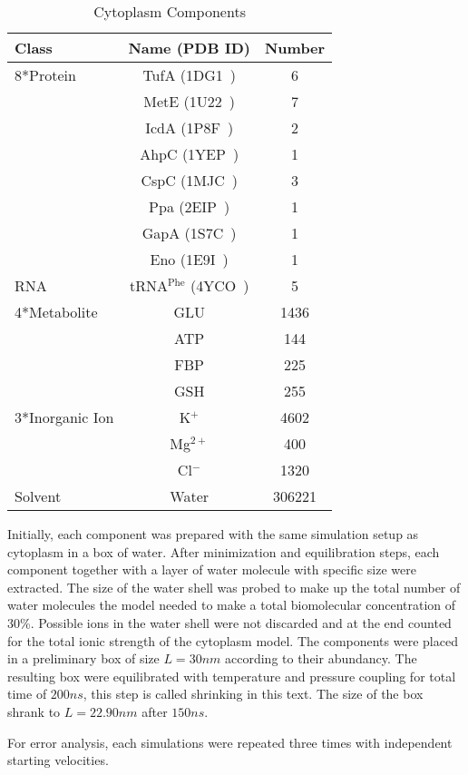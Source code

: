 \documentclass[journal=jacsat,manuscript=article]{achemso}
\begin{document}
\begin{table}[h!]
\label{tbl:component}
\centering
\begin{tabular}{lcc}
\hline
Class & Name (PDB ID) & Number\\
\hline
8*Protein & TufA (1DG1~\cite{Abel1996}) & 6\\
  & MetE (1U22~\cite{Ferrer2004}) & 7\\
  & IcdA (1P8F~\cite{Mesecar2000}) & 2\\
  & AhpC (1YEP~\cite{Parsonage2005}) & 1\\
  & CspC (1MJC~\cite{Schindelin1994}) & 3\\
  & Ppa (2EIP~\cite{Kankare1996}) & 1\\
  & GapA (1S7C~\cite{ShinXXX}) & 1\\
  & Eno (1E9I~\cite{Kuhnel2001}) & 1\\
\hline
RNA & tRNA$^{\text{Phe}}$ (4YCO~\cite{Byrne2015}) & 5\\
\hline
4*Metabolite & GLU & 1436\\
  & ATP & 144\\
  & FBP & 225\\
  & GSH & 255\\
\hline
3*Inorganic Ion & K$^{+}$ & 4602\\
  & Mg$^{2+}$ & 400\\
  & Cl$^{-}$ & 1320\\
\hline
Solvent & Water & 306221\\
\hline
\end{tabular}
\caption{Cytoplasm Components}
\end{table}

Initially, each component was prepared with the same simulation setup as cytoplasm in a box of water. After minimization and equilibration steps, each component together with a layer of water molecule with specific size were extracted. The size of the water shell was probed to make up the total number of water molecules the model needed to make a total biomolecular concentration of 30\%. Possible ions in the water shell were not discarded and at the end counted for the total ionic strength of the cytoplasm model. The components were placed in a preliminary box of size $L=30 nm$ according to their abundancy. The resulting box were equilibrated with temperature and pressure coupling for total time of $200 ns$, this step is called shrinking in this text. The size of the box shrank to $L=22.90 nm$ after $150 ns$.

For error analysis, each simulations were repeated three times with independent starting velocities.
\end{document}
